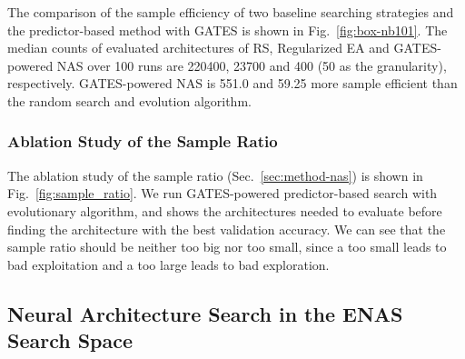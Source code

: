 \documentclass[runningheads]{llncs}
\begin{document}
The comparison of the sample efficiency of two baseline searching strategies and the predictor-based method with GATES is shown in Fig.~\ref{fig:box-nb101}.
The median counts of evaluated architectures of RS, Regularized EA and GATES-powered NAS over 100 runs are 220400, 23700 and 400 (50 as the granularity), respectively.
GATES-powered NAS is 551.0 and 59.25 more sample efficient than the random search and evolution algorithm.

\subsubsection{Ablation Study of the Sample Ratio }
The ablation study of the sample ratio  (Sec.~\ref{sec:method-nas}) is shown in Fig.~\ref{fig:sample_ratio}.
We run GATES-powered predictor-based search with evolutionary algorithm, and shows the architectures needed to evaluate before finding the architecture with the best validation accuracy. 
We can see that the sample ratio  should be neither too big nor too small, since a too small  leads to bad exploitation and a too large  leads to bad exploration.



\subsection{Neural Architecture Search in the ENAS Search Space}
\label{sec:exp-nas-enas}
\end{document}
